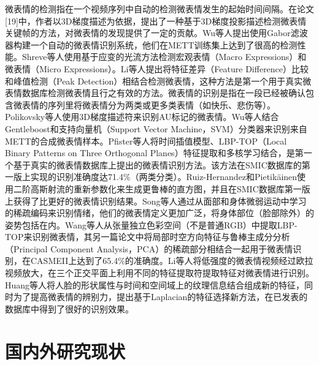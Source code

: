 微表情的检测指在一个视频序列中自动的检测微表情发生的起始时间间隔。在论文[19]中，作者以3D梯度描述为依据，提出了一种基于3D梯度投影描述检测微表情关键帧的方法，对微表情的发现提供了一定的贡献。Wu等人提出使用Gabor滤波器构建一个自动的微表情识别系统，他们在METT训练集上达到了很高的检测性能。Shreve等人使用基于应变的光流方法检测宏观表情（Macro Expressions）和微表情（Micro Expressions）。Li等人提出将特征差异（Feature Difference）比较和峰值检测（Peak Detection）相结合检测微表情，这种方法是第一个用于真实微表情数据库检测微表情且行之有效的方法。微表情的识别是指在一段已经被确认包含微表情的序列里将微表情分为两类或更多类表情（如快乐、悲伤等）。Polikovsky等人使用3D梯度描述符来识别AU标记的微表情。Wu等人结合Gentleboost和支持向量机（Support Vector Machine，SVM）分类器来识别来自METT的合成微表情样本。Pfister等人将时间插值模型、LBP-TOP（Local Binary Patterns on Three Orthogonal Planes）特征提取和多核学习结合，是第一个基于真实的微表情数据库上提出的微表情识别方法。该方法在SMIC数据库的第一版上实现的识别准确度达71.4\%（两类分类）。Ruiz-Hernandez和Pietikäinen使用二阶高斯射流的重新参数化来生成更鲁棒的直方图，并且在SMIC数据库第一版上获得了比更好的微表情识别结果。Song等人通过从面部和身体微弱运动中学习的稀疏编码来识别情绪，他们的微表情定义更加广泛，将身体部位（脸部除外）的姿势包括在内。Wang等人从张量独立色彩空间（不是普通RGB）中提取LBP-TOP来识别微表情，其另一篇论文中将局部时空方向特征与鲁棒主成分分析（Principal Component Analysis，PCA）的稀疏部分相结合一起用于微表情识别，在CASMEII上达到了65.4\%的准确度。Li等人将低强度的微表情视频经过欧拉视频放大，在三个正交平面上利用不同的特征提取符提取特征对微表情进行识别。Huang等人将人脸的形状属性与时间和空间域上的纹理信息结合组成新的特征，同时为了提高微表情的辨别力，提出基于Laplacian的特征选择新方法，在已发表的数据库中得到了很好的识别效果。


\section{国内外研究现状}\label{sec:system}

